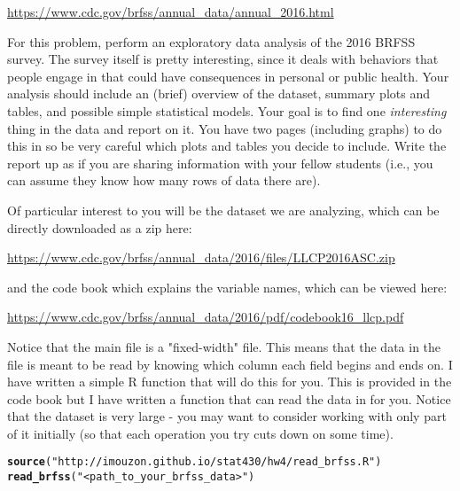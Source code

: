 \documentclass[11pt]{article}\usepackage[]{graphicx}\usepackage[]{color}
\makeatletter
\newcommand{\hlstr}[1]{\textcolor[rgb]{0.192,0.494,0.8}{#1}}%
\newcommand{\hlstd}[1]{\textcolor[rgb]{0.345,0.345,0.345}{#1}}%
\newcommand{\hlkwd}[1]{\textcolor[rgb]{0.737,0.353,0.396}{\textbf{#1}}}%
\newenvironment{kframe}{%
 \def\at@end@of@kframe{}%
 \ifinner\ifhmode%
  \def\at@end@of@kframe{\end{minipage}}%
  \begin{minipage}{\columnwidth}%
 \fi\fi%
 \def\FrameCommand##1{\hskip\@totalleftmargin \hskip-\fboxsep
 \colorbox{shadecolor}{##1}\hskip-\fboxsep
     \hskip-\linewidth \hskip-\@totalleftmargin \hskip\columnwidth}%
 \MakeFramed {\advance\hsize-\width
   \@totalleftmargin\z@ \linewidth\hsize
   \@setminipage}}%
 {\par\unskip\endMakeFramed%
 \at@end@of@kframe}
\newenvironment{knitrout}{}{} %
\makeatother
\begin{document}
\begin{enumerate}
\url{https://www.cdc.gov/brfss/annual_data/annual_2016.html}

For this problem, perform an exploratory data analysis of the 2016 BRFSS survey. The survey itself is pretty interesting, since it deals with behaviors that people engage in that could have consequences in personal or public health. Your analysis should include an (brief) overview of the dataset, summary plots and tables, and possible simple statistical models. Your goal is to find one \textit{interesting} thing in the data and report on it. You have two pages (including graphs) to do this in so be very careful which plots and tables you decide to include. Write the report up as if you are sharing information with your fellow students (i.e., you can assume they know how many rows of data there are).

Of particular interest to you will be the dataset we are analyzing, which can be directly downloaded as a zip here:

\url{https://www.cdc.gov/brfss/annual_data/2016/files/LLCP2016ASC.zip}

and the code book which explains the variable names, which can be viewed here:

\url{https://www.cdc.gov/brfss/annual_data/2016/pdf/codebook16_llcp.pdf}

Notice that the main file is a "fixed-width" file. This means that the data in the file is meant to be read by knowing which column each field begins and ends on. I have written a simple R function that will do this for you. This is provided in the code book but I have written a function that can read the data in for you. Notice that the dataset is very large - you may want to consider working with only part of it initially (so that each operation you try cuts down on some time).

\begin{knitrout}
\color{fgcolor}\begin{kframe}
\begin{alltt}
\hlkwd{source}\hlstd{(}\hlstr{"http://imouzon.github.io/stat430/hw4/read_brfss.R"}\hlstd{)}
\hlkwd{read_brfss}\hlstd{(}\hlstr{"<path_to_your_brfss_data>"}\hlstd{)}
\end{alltt}
\end{kframe}
\end{knitrout}

\end{enumerate}
\end{document}
